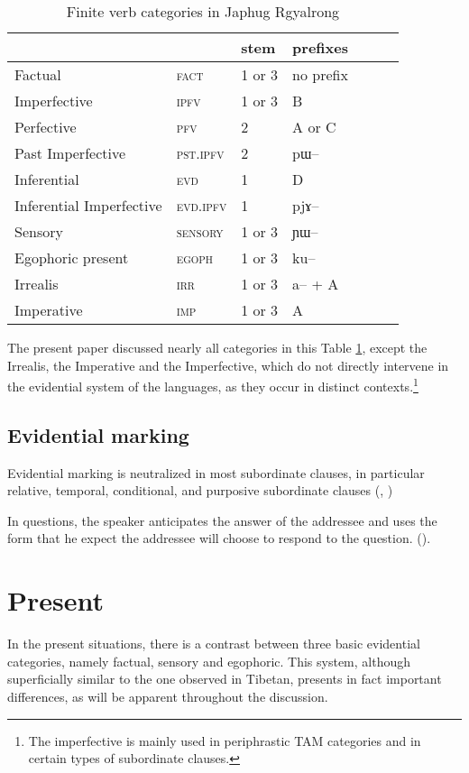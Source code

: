 \documentclass[oldfontcommands,oneside,a4paper,11pt]{article}
\newcommand{\ipa}[1]{{\phon \mbox{#1}}} %
\begin{document}
\begin{table}[H]
\caption{Finite verb categories in Japhug Rgyalrong} \label{tab:finite.forms} \centering
\begin{tabular}{lllllll}
\toprule
&	&	stem&	prefixes\\
\midrule
Factual&	\textsc{fact} &	1 or 3&	no prefix\\
Imperfective&	\textsc{ipfv} &	1 or 3&	B\\
Perfective&	\textsc{pfv} &	2&	A or C\\
Past Imperfective&	\textsc{pst.ipfv} &	2&	\ipa{pɯ--}\\
Inferential&	\textsc{evd} &	1&	D\\
Inferential Imperfective&	\textsc{evd.ipfv} &	1&	\ipa{pjɤ--}\\
Sensory&	\textsc{sensory} &	1 or 3&	\ipa{ɲɯ--}\\
Egophoric present&	\textsc{egoph} &	1 or 3&	\ipa{ku--}\\
Irrealis&	\textsc{irr} &	1 or 3&	\ipa{a--} + A\\
Imperative&	\textsc{imp} &	1 or 3&	A\\
\bottomrule
\end{tabular}
\end{table}

The present paper discussed nearly all categories in this Table \ref{tab:finite.forms}, except the Irrealis, the Imperative and the Imperfective, which do not directly intervene in the evidential system of the languages, as they occur in distinct contexts.\footnote{The imperfective is mainly used in periphrastic TAM categories and in certain types of subordinate clauses.}

\subsection{Evidential marking} \label{sec:anticipation}
Evidential marking is neutralized in most subordinate clauses, in particular relative, temporal, conditional, and purposive subordinate clauses (\citealt[253-6]{aikhenvald06},  \citealt{jacques14linking}) 

 In questions,  the speaker anticipates the answer of the addressee and uses the form that he expect the addressee will choose to respond to the question. (\citealt[244]{tournadre14evidentiality}).

\section{Present} \label{sec:evd:prs}
In the present situations, there is a contrast between three basic evidential categories, namely factual, sensory and egophoric. This system, although superficially similar to the one observed in Tibetan, presents in fact important differences, as will be apparent throughout the discussion.
\end{document}

